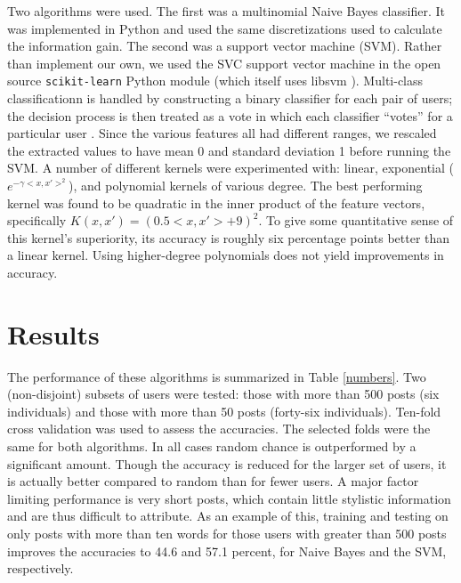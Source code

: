\documentclass[12pt,letterpaper,onecolumn,oneside]{article}
\numberwithin{equation}{section}
\numberwithin{figure}{section}
\begin{document}
Two algorithms were used. The first was a multinomial Naive Bayes classifier. It was implemented in Python and used the same discretizations used to calculate the information gain. The second was a support vector 
machine (SVM). Rather than implement our own, we used the SVC support vector machine in the open source \verb+scikit-learn+ \cite{scikit-learn} Python module (which itself uses libsvm \cite{libsvm}). 
Multi-class classificationn is handled by constructing a binary classifier for each pair of users; the decision process is then treated as a vote in which each classifier ``votes'' for a particular user 
\cite{libsvm}. Since the various features all had different ranges, we rescaled the extracted values to have mean 0 and standard deviation 1 before running the SVM. A number of different kernels were experimented 
with: linear, exponential (\(e^{-\gamma <x,x'>^2}\)), and polynomial kernels of various degree. The best performing kernel was found to be quadratic in the inner product of the feature vectors, specifically 
\(K(x,x') = (0.5<x,x'>+9)^2\). To give some quantitative sense of this kernel's superiority, its accuracy is roughly six percentage points better than a linear kernel. Using higher-degree polynomials does not yield 
improvements in accuracy.

\section{Results}
The performance of these algorithms is summarized in Table \ref{numbers}. Two (non-disjoint) subsets of users were tested: those with more than 500 posts (six individuals) and those with more than 50 posts 
(forty-six individuals). Ten-fold cross validation was used to assess the accuracies. The selected folds were the same for both algorithms. In all cases random chance is outperformed by a significant amount. 
Though the accuracy is reduced for the larger set of users, it is actually better compared to random than for fewer users. A major factor limiting performance is very short posts, which contain little stylistic 
information and are thus difficult to attribute. As an example of this, training and testing on only posts with more than ten words for those users with greater than 500 posts improves the accuracies to 
44.6 and 57.1 percent, for Naive Bayes and the SVM, respectively. 
\end{document}

